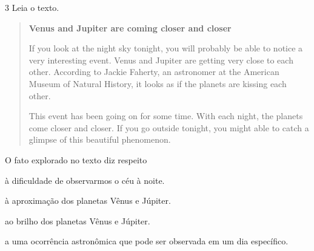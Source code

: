 \pagebreak
\num{3} Leia o texto.

\begin{quote}
\textbf{Venus and Jupiter are coming closer and closer}

If you look at the night sky tonight, you will probably be able to notice a very interesting event. Venus and Jupiter are getting very close to each other. According to Jackie Faherty, an astronomer at the American Museum of Natural History, it looks as if the planets are kissing each other.

This event has been going on for some time. With each night, the planets come closer and closer. If you go outside tonight, you might able to catch a glimpse of this beautiful phenomenon. 

\end{quote}

O fato explorado no texto diz respeito

\begin{escolha}
\item à dificuldade de observarmos o céu à noite.

\item à aproximação dos planetas Vênus e Júpiter.

\item ao brilho dos planetas Vênus e Júpiter.

\item a uma ocorrência astronômica que pode ser observada em um dia específico.
\end{escolha}





